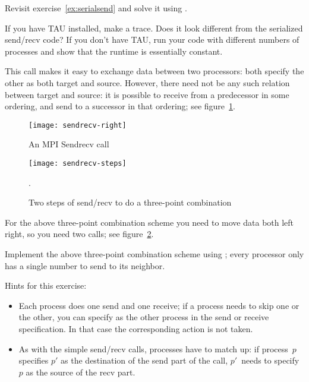 \begin{exercise}
  \label{ex:rightsendrecv}
  Revisit exercise~\ref{ex:serialsend} and solve it using
  .

  If you have TAU installed, make a trace. Does it look different
  from the serialized send/recv code? If you don't have TAU, run your
  code with different numbers of processes and show that the runtime
  is essentially constant.
\end{exercise}

This call makes it easy to exchange data between two processors: both
specify the other as both target and source. However, there need not
be any such relation between target and source: it is possible to
receive from a predecessor in some ordering, and send to a successor
in that ordering; see figure~\ref{fig:sendrecv}.

\begin{figure}[ht]
  \texttt{[image: sendrecv-right]}
  \caption{An MPI Sendrecv call}
  \label{fig:sendrecv}
\end{figure}

\begin{figure}[ht]
  \texttt{[image: sendrecv-steps]}
  \caption{Two steps of send/recv to do a three-point combination}
  \label{fig:sendrecv-steps}.
\end{figure}

For the above three-point combination scheme you need to move data
both left right, so you need two  calls;
see figure~\ref{fig:sendrecv-steps}.

\begin{exercise}
  \label{ex:3ptsendrecv}
  Implement the above three-point combination scheme using ;
  every processor only has a single number to send to its neighbor.
\end{exercise}

Hints for this exercise:
\begin{itemize}
\item Each process does one send and one receive; if a process needs
  to skip one or the other, you can specify
   as the other process in the send or
  receive specification. In that case the corresponding action
  is not taken.
\item As with the simple send/recv calls, processes have to match up:
  if process~$p$ specifies $p'$ as the destination of the send part of
  the call, $p'$~needs to specify $p$ as the source of the recv part.
\end{itemize}


